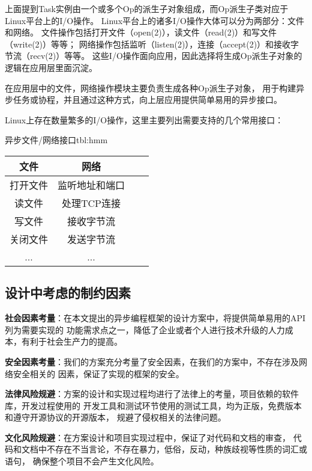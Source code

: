 \documentclass[supercite]{HustGraduPaper}
\theoremstyle{definition}
\begin{document}
上面提到Task实例由一个或多个Op的派生子对象组成，而Op派生子类对应于Linux平台上的I/O操作。
Linux平台上的诸多I/O操作大体可以分为两部分：文件和网络。
文件操作包括打开文件（open(2)），读文件（read(2)）和写文件（write(2)）等等；
网络操作包括监听（listen(2)），连接（accept(2)）和接收字节流（recv(2)）等等。
这些I/O操作面向应用，因此选择将生成Op派生子对象的逻辑在应用层里面沉淀。\par

在应用层中的文件，网络操作模块主要负责生成各种Op派生子对象，
用于构建异步任务或协程，并且通过这种方式，向上层应用提供简单易用的异步接口。\par

Linux上存在数量繁多的I/O操作，这里主要列出需要支持的几个常用接口：

\begin{generaltab}{异步文件/网络接口}{tbl:hmm}
  \begin{tabular}{c|ccc}
    \toprule
    文件 & 网络 \\
    \midrule
    打开文件 & 监听地址和端口 \\
    读文件 & 处理TCP连接 \\
    写文件 & 接收字节流 \\
    关闭文件 & 发送字节流 \\
    ... & ... \\
    \bottomrule
  \end{tabular}
\end{generaltab}

\subsection{设计中考虑的制约因素}

\textbf{社会因素考量}：在本文提出的异步编程框架的设计方案中，将提供简单易用的API列为需要实现的
功能需求点之一，降低了企业或者个人进行技术升级的人力成本，有利于社会生产力的提高。\par

\textbf{安全因素考量}：我们的方案充分考量了安全因素，在我们的方案中，不存在涉及网络安全相关的
因素，保证了实现的框架的安全。\par

\textbf{法律风险规避}：方案的设计和实现过程均进行了法律上的考量，项目依赖的软件库，开发过程使用的
开发工具和测试环节使用的测试工具，均为正版，免费版本和遵守开源协议的开源版本，
规避了侵权相关的法律问题。\par

\textbf{文化风险规避}：在方案设计和项目实现过程中，保证了对代码和文档的审查，
代码和文档中不存在不当言论，不存在暴力，低俗，反动，种族歧视等性质的词汇或语句，
确保整个项目不会产生文化风险。\par
\end{document}
